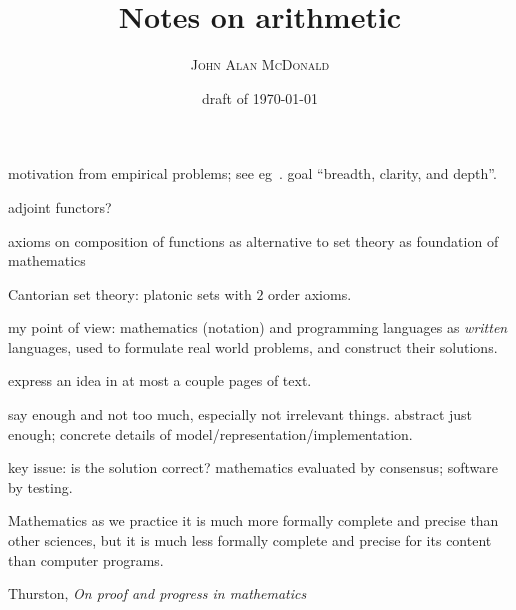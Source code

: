 \documentclass[10pt,openany]{book}
\title{Notes on arithmetic}
\author{\textsc{John Alan McDonald}}
\date{draft of \today}
\begin{document}
\maketitle


% 

\setcounter{baseSectionLevel}{6}

motivation from empirical problems; 
see eg~\cite{maclane1981mathModels}.
goal ``breadth, clarity, and depth''.

adjoint functors?

axioms on composition of functions as alternative to set theory
as foundation of mathematics

Cantorian set theory: platonic sets with $2$ order axioms.

my point of view: 
mathematics (notation) and programming languages
as \textit{written} languages,
used to formulate real world problems,
and construct their solutions.

express an idea in at most a couple pages of text.

say enough and not too much, especially not irrelevant things.
abstract just enough; 
concrete details of model/representation/implementation.

key issue: is the solution correct?
mathematics evaluated by consensus;
software by testing.

\epigraph{Mathematics as we practice it is much more formally 
complete and precise than
other sciences, but it is much less formally complete and precise 
for its content
than computer programs.}%
{Thurston, \textit{On proof and progress in mathematics}~\cite{thurston1994proof}}


%

\setcounter{currentlevel}{\value{baseSectionLevel}}

\setcounter{currentlevel}{\value{baseSectionLevel}}

\setcounter{currentlevel}{\value{baseSectionLevel}}

\setcounter{currentlevel}{\value{baseSectionLevel}}

\setcounter{currentlevel}{\value{baseSectionLevel}}

\setcounter{currentlevel}{\value{baseSectionLevel}}

\end{document}
